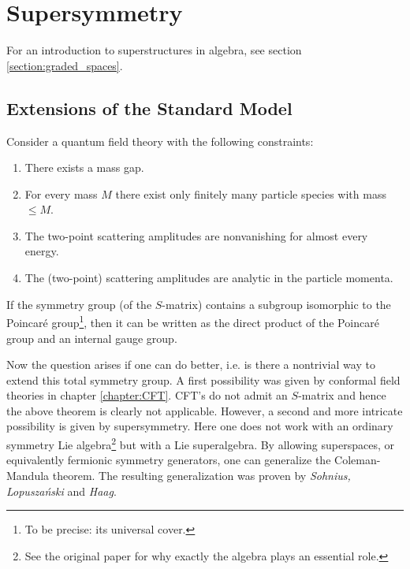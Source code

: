 \chapter{Supersymmetry}

    For an introduction to superstructures in algebra, see section \ref{section:graded_spaces}.

\section{Extensions of the Standard Model}

    \begin{theorem}
        Consider a quantum field theory with the following constraints:
        \begin{enumerate}
            \item There exists a mass gap.
            \item For every mass $M$ there exist only finitely many particle species with mass $\leq M$.
            \item The two-point scattering amplitudes are nonvanishing for almost every energy.
            \item The (two-point) scattering amplitudes are analytic in the particle momenta.
        \end{enumerate}
        If the symmetry group (of the $S$-matrix) contains a subgroup isomorphic to the Poincar\'e group\footnote{To be precise: its universal cover.}, then it can be written as the direct product of the Poincar\'e group and an internal gauge group.
    \end{theorem}

    Now the question arises if one can do better, i.e. is there a nontrivial way to extend this total symmetry group. A first possibility was given by conformal field theories in chapter \ref{chapter:CFT}. CFT's do not admit an $S$-matrix and hence the above theorem is clearly not applicable. However, a second and more intricate possibility is given by supersymmetry. Here one does not work with an ordinary symmetry Lie algebra\footnote{See the original paper \cite{coleman_mandula} for why exactly the algebra plays an essential role.} but with a Lie superalgebra. By allowing superspaces, or equivalently fermionic symmetry generators, one can generalize the Coleman-Mandula theorem. The resulting generalization was proven by \textit{Sohnius, Lopusza\'nski} and \textit{Haag}.